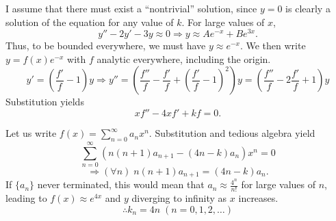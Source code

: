 \item
I assume that there must exist a ``nontrivial'' solution,
since $y = 0$ is clearly a solution of the equation for any value of $k$.
For large values of $x$,
\[
	y'' - 2y' - 3y \approx 0
	\Rightarrow y \approx A e^{-x} + B e^{3x}.
\]
Thus, to be bounded everywhere, we must have $y \approx e^{-x}$.
We then write $y = f(x) e^{-x}$ with $f$ analytic everywhere, including the origin.
\[
	y' = \left( \frac{f'}{f} - 1 \right) y
	\Rightarrow y'' = \left( \frac{f''}{f} - \frac{f'}{f} + {\left( \frac{f'}{f} - 1 \right)}^2 \right) y
	= \left( \frac{f''}{f} - 2 \frac{f'}{f} + 1 \right) y
\]
Substitution yields
\[
	xf'' - 4xf' + kf = 0.
\]

Let us write $f(x) = \sum_{n=0}^\infty a_n x^n$.
Substitution and tedious algebra yield
\[
	\sum_{n=0}^\infty (n(n + 1)a_{n + 1} - (4n - k) a_n) x^n = 0
\]
\[
	\Rightarrow (\forall n)\; n(n + 1)a_{n + 1} = (4n - k) a_n.
\]
If $\{a_n\}$ never terminated, this would mean that $a_n \approx \frac{4^n}{n!}$ for large values of $n$,
leading to $f(x) \approx e^{4x}$ and $y$ diverging to infinity as $x$ increases.
\[
	\therefore k_n = 4n\; (n = 0, 1, 2, \dots)
\]